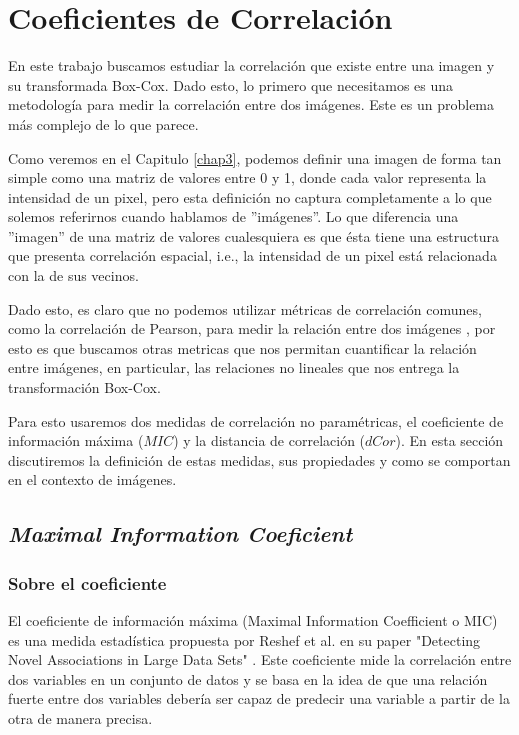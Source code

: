 \chapter{Coeficientes de Correlaci\'on}\label{chap2}
        
    En este trabajo buscamos estudiar la correlaci\'on que existe entre una imagen y su transformada Box-Cox. Dado esto, lo primero que necesitamos es una metodolog\'ia para medir la correlaci\'on entre dos im\'agenes. Este es un problema m\'as complejo de lo que parece. 

    Como veremos en el Capitulo \ref{chap3}, podemos definir una imagen de forma tan simple como una matriz de valores entre 0 y 1, donde cada valor representa la intensidad de un pixel, pero esta definici\'on no captura completamente a lo que solemos referirnos cuando hablamos de ''im\'agenes''. Lo que diferencia una ''imagen'' de una matriz de valores cualesquiera es que \'esta tiene una estructura que presenta correlaci\'on espacial, i.e., la intensidad de un pixel est\'a relacionada con la de sus vecinos.

    Dado esto, es claro que no podemos utilizar m\'etricas de correlaci\'on comunes, como la correlaci\'on de Pearson, para medir la relaci\'on entre dos im\'agenes \cite{personbad}, por esto es que buscamos otras metricas que nos permitan cuantificar la relaci\'on entre im\'agenes, en particular, las relaciones no lineales que nos entrega la transformaci\'on Box-Cox.

    Para esto usaremos dos medidas de correlaci\'on no param\'etricas, el coeficiente de informaci\'on m\'axima ($MIC$) y la distancia de correlaci\'on ($dCor$). En esta secci\'on discutiremos la definici\'on de estas medidas, sus propiedades y como se comportan en el contexto de im\'agenes.

    \section{\textit{Maximal Information Coeficient}} 
    
    \subsection{Sobre el coeficiente}
    
        El coeficiente de informaci\'on m\'axima (Maximal Information Coefficient o MIC) es una medida estad\'istica propuesta por Reshef et al. en su paper "Detecting Novel Associations in Large Data Sets" \cite{Reshef2011}. Este coeficiente mide la correlaci\'on entre dos variables en un conjunto de datos y se basa en la idea de que una relaci\'on fuerte entre dos variables deber\'ia ser capaz de predecir una variable a partir de la otra de manera precisa.
    
